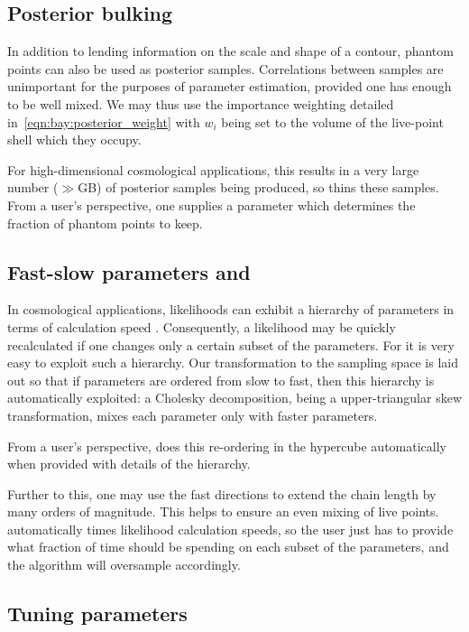 \subsection{Posterior bulking}
\label{sec:pc:posterior_bulking}
In addition to lending information on the scale and shape of a contour, phantom points can also be used as posterior samples. Correlations between samples are unimportant for the purposes of parameter estimation, provided one has enough to be well mixed. We may thus use the importance weighting detailed in~\eqref{eqn:bay:posterior_weight} with \(w_i\) being set to the volume of the live-point shell which they occupy.

For high-dimensional cosmological applications, this results in a very large number (\(\gg\)GB) of posterior samples being produced, so \PolyChord{} thins these samples. From a user's perspective, one supplies a parameter which determines the fraction of phantom points to keep.

\subsection{Fast-slow parameters and \CosmoChord}
\label{sec:pc:fast_slow}

In cosmological applications, likelihoods can exhibit a hierarchy of parameters in terms of calculation speed \citep{LewisFastSlow}. Consequently, a likelihood may be quickly recalculated if one changes only a certain subset of the parameters. For \PolyChord{} it is very easy to exploit such a hierarchy. Our transformation to the sampling space is laid out so that if parameters are ordered from slow to fast, then this hierarchy is automatically exploited: a Cholesky decomposition, being a upper-triangular skew transformation, mixes each parameter only with faster parameters.

From a user's perspective, \PolyChord{} does this re-ordering in the hypercube automatically when provided with details of the hierarchy.

Further to this, one may use the fast directions to extend the chain length by many orders of magnitude. This helps to ensure an even mixing of live points. \PolyChord{} automatically times likelihood calculation speeds, so the user just has to provide what fraction of time \PolyChord{} should be spending on each subset of the parameters, and the algorithm will oversample accordingly.

\subsection{Tuning parameters}
\label{sec:pc:tuning_params}

